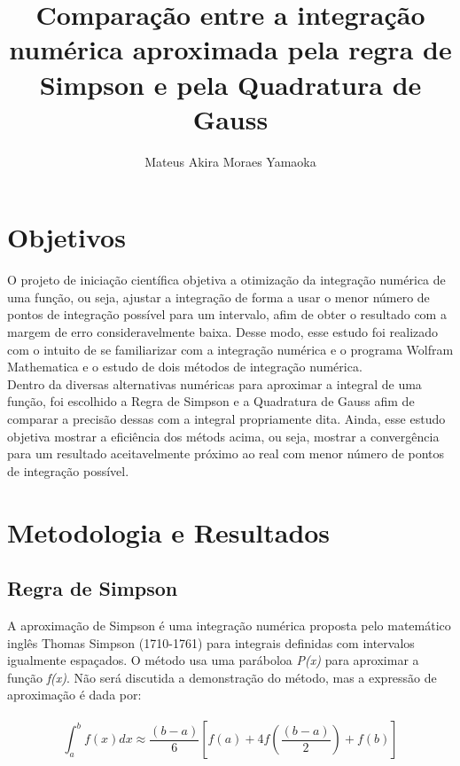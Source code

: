 \documentclass[12pt,a4paper]{article}
\begin{document}
\title{{\Huge \textbf{Comparação entre a integração numérica aproximada pela regra de Simpson e pela Quadratura de Gauss}}}
\author{Mateus Akira Moraes Yamaoka}
\maketitle


\newpage
\section{Objetivos}
\qquad O projeto de iniciação científica objetiva a otimização da integração numérica de uma função, ou seja, ajustar a integração de forma a usar o menor número de pontos de integração possível para um intervalo, afim de obter o resultado com a margem de erro consideravelmente baixa. Desse modo, esse estudo foi realizado com o intuito de se familiarizar com a integração numérica e o programa Wolfram Mathematica e o estudo de dois métodos de integração numérica.\\

\quad Dentro da diversas alternativas numéricas para aproximar a integral de uma função, foi escolhido a Regra de Simpson e a Quadratura de Gauss afim de comparar a precisão dessas com a integral propriamente dita. Ainda, esse estudo objetiva mostrar a eficiência dos métods acima, ou seja, mostrar a convergência para um resultado aceitavelmente próximo ao real com menor número de pontos de integração possível.

\newpage
\section{Metodologia e Resultados}
\subsection{Regra de Simpson}
\qquad A aproximação de Simpson é uma integração numérica proposta pelo matemático inglês Thomas Simpson (1710-1761) para integrais definidas com intervalos igualmente espaçados. O método usa uma paráboloa \textit{P(x)} para aproximar a função \textit{f(x)}. Não será discutida a demonstração do método, mas a expressão de aproximação é dada por:\\
\\
\begin{equation}
\int_{a}^{b} f(x)dx \approx \dfrac{(b-a)}{6} [f(a) + 4f(\dfrac{(b-a)}{2}) + f(b)] 
\end{equation}
\end{document}
